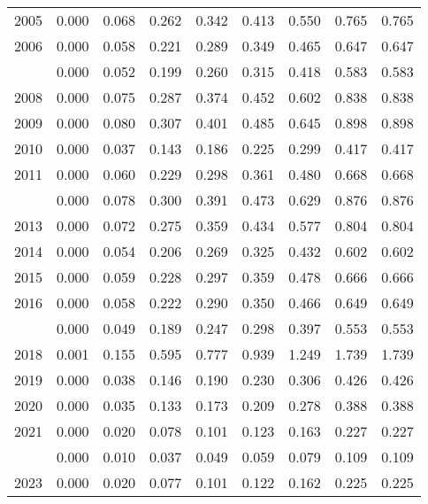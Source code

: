 \documentclass[
]{article}
\begin{document}
\begin{longtable}[t]{lrrrrrrrr}
2005 & 0.000 & 0.068 & 0.262 & 0.342 & 0.413 & 0.550 & 0.765 & 0.765\\
2006 & 0.000 & 0.058 & 0.221 & 0.289 & 0.349 & 0.465 & 0.647 & 0.647\\
\addlinespace
2007 & 0.000 & 0.052 & 0.199 & 0.260 & 0.315 & 0.418 & 0.583 & 0.583\\
2008 & 0.000 & 0.075 & 0.287 & 0.374 & 0.452 & 0.602 & 0.838 & 0.838\\
2009 & 0.000 & 0.080 & 0.307 & 0.401 & 0.485 & 0.645 & 0.898 & 0.898\\
2010 & 0.000 & 0.037 & 0.143 & 0.186 & 0.225 & 0.299 & 0.417 & 0.417\\
2011 & 0.000 & 0.060 & 0.229 & 0.298 & 0.361 & 0.480 & 0.668 & 0.668\\
\addlinespace
2012 & 0.000 & 0.078 & 0.300 & 0.391 & 0.473 & 0.629 & 0.876 & 0.876\\
2013 & 0.000 & 0.072 & 0.275 & 0.359 & 0.434 & 0.577 & 0.804 & 0.804\\
2014 & 0.000 & 0.054 & 0.206 & 0.269 & 0.325 & 0.432 & 0.602 & 0.602\\
2015 & 0.000 & 0.059 & 0.228 & 0.297 & 0.359 & 0.478 & 0.666 & 0.666\\
2016 & 0.000 & 0.058 & 0.222 & 0.290 & 0.350 & 0.466 & 0.649 & 0.649\\
\addlinespace
2017 & 0.000 & 0.049 & 0.189 & 0.247 & 0.298 & 0.397 & 0.553 & 0.553\\
2018 & 0.001 & 0.155 & 0.595 & 0.777 & 0.939 & 1.249 & 1.739 & 1.739\\
2019 & 0.000 & 0.038 & 0.146 & 0.190 & 0.230 & 0.306 & 0.426 & 0.426\\
2020 & 0.000 & 0.035 & 0.133 & 0.173 & 0.209 & 0.278 & 0.388 & 0.388\\
2021 & 0.000 & 0.020 & 0.078 & 0.101 & 0.123 & 0.163 & 0.227 & 0.227\\
\addlinespace
2022 & 0.000 & 0.010 & 0.037 & 0.049 & 0.059 & 0.079 & 0.109 & 0.109\\
2023 & 0.000 & 0.020 & 0.077 & 0.101 & 0.122 & 0.162 & 0.225 & 0.225\\*
\end{longtable}
\end{document}
